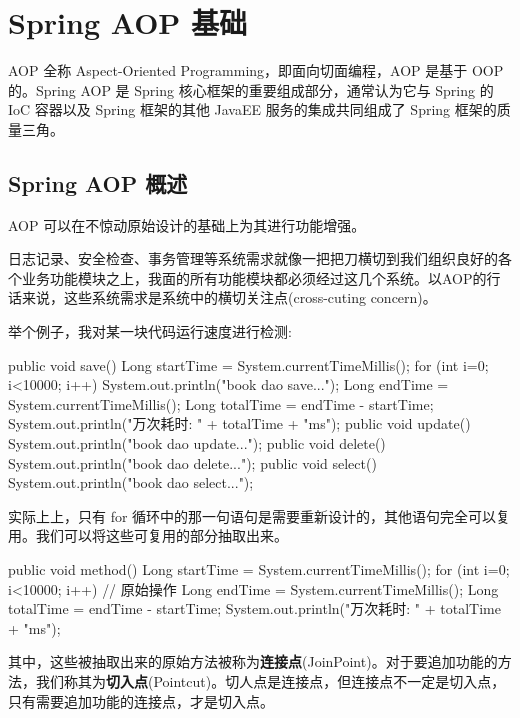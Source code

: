 \section{Spring AOP 基础}

AOP 全称 Aspect-Oriented Programming，即面向切面编程，AOP 是基于 OOP 的。Spring AOP 是 Spring 核心框架的重要组成部分，通常认为它与 Spring 的 IoC 容器以及 Spring 框架的其他 JavaEE 服务的集成共同组成了 Spring 框架的质量三角。

\subsection{Spring AOP 概述}

AOP 可以在不惊动原始设计的基础上为其进行功能增强。

日志记录、安全检查、事务管理等系统需求就像一把把刀横切到我们组织良好的各个业务功能模块之上，我面的所有功能模块都必须经过这几个系统。以AOP的行话来说，这些系统需求是系统中的横切关注点(cross-cuting concern)。

举个例子，我对某一块代码运行速度进行检测:

\begin{Java}
public void save() {
    Long startTime = System.currentTimeMillis();
    for (int i=0; i<10000; i++) {
        System.out.println("book dao save...");
    }
    Long endTime = System.currentTimeMillis();
    Long totalTime = endTime - startTime;
    System.out.println("万次耗时: " + totalTime + "ms");
}
public void update() {
    System.out.println("book dao update...");
}
public void delete() {
    System.out.println("book dao delete...");
}
public void select() {
    System.out.println("book dao select...");
}
\end{Java}

实际上上，只有 for 循环中的那一句语句是需要重新设计的，其他语句完全可以复用。我们可以将这些可复用的部分抽取出来。

\begin{Java}
public void method() {
    Long startTime = System.currentTimeMillis();
    for (int i=0; i<10000; i++) {
        // 原始操作
    }
    Long endTime = System.currentTimeMillis();
    Long totalTime = endTime - startTime;
    System.out.println("万次耗时: " + totalTime + "ms");
}
\end{Java}

其中，这些被抽取出来的原始方法被称为\textbf{连接点}(JoinPoint)。对于要追加功能的方法，我们称其为\textbf{切入点}(Pointcut)。切人点是连接点，但连接点不一定是切入点，只有需要追加功能的连接点，才是切入点。

